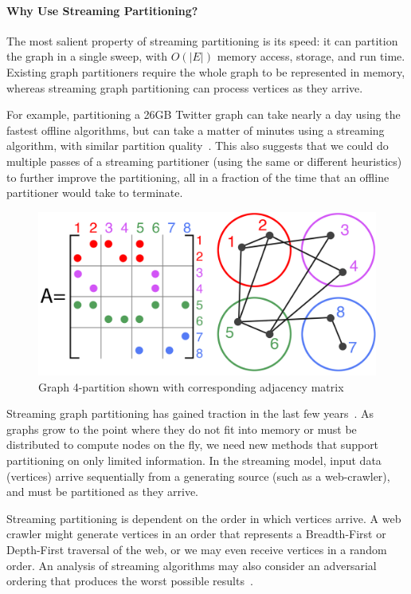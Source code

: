 \paragraph{Why Use Streaming Partitioning?}
The most salient property of streaming partitioning is its speed: it can partition the graph in a single sweep, with $O(|E|)$ memory access, storage, and run time.
Existing graph partitioners require the whole graph to be represented in memory, whereas streaming graph partitioning can process vertices as they arrive.

For example, partitioning a 26GB Twitter graph can take nearly a day using the fastest offline algorithms, but can take a matter of minutes using a streaming algorithm, with similar partition quality~\cite{tsourakakis2012fennel}.
This also suggests that we could do multiple passes of a streaming partitioner (using the same or different heuristics) to further improve the partitioning, all in a fraction of the time that an offline partitioner would take to terminate.


\begin{figure}[h]
\centering
\includegraphics[width=0.85\columnwidth] {figures/graphpart1.png}
\caption[Caption for]{Graph 4-partition shown with corresponding adjacency matrix}
\label{fig:0}
\end{figure}


Streaming graph partitioning has gained traction in the last few years~\cite{DBLP:journals/corr/abs-1212-1121,Stanton:2012:SGP:2339530.2339722,tsourakakis2012fennel}.
As graphs grow to the point where they do not fit into memory or must be distributed to compute nodes on the fly, we need new methods that support partitioning on only limited information.
In the streaming model, input data (vertices) arrive sequentially from a generating source (such as a web-crawler), and must be partitioned as they arrive.

Streaming partitioning is dependent on the order in which vertices arrive.
A web crawler might generate vertices in an order that represents a Breadth-First or Depth-First traversal of the web, or we may even receive vertices in a random order.
An analysis of streaming algorithms may also consider an adversarial ordering that produces the worst possible results~\cite{Stanton:2012:SGP:2339530.2339722}.

